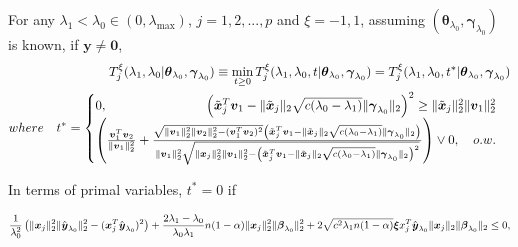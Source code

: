 \begin{theorem}
    \label{thm:2.2}
    For any $\lambda_1<\lambda_{0}\in (0,\lambda_\textrm{max})$, $j=1,2,...,p$ and $\xi=-1,1$, assuming $(\boldsymbol\theta_{\lambda_0},\boldsymbol\gamma_{\lambda_0})$ is known, if $\boldsymbol y\neq \boldsymbol 0$,
    \begin{gather}
        \begin{aligned}
            T^\xi_j(\lambda_1,\lambda_0|\boldsymbol\theta_{\lambda_0},\boldsymbol\gamma_{\lambda_0})\equiv\underset{t\geq 0}{\mathrm{min}}\,T^\xi_j(\lambda_1,\lambda_0,t|\boldsymbol\theta_{\lambda_0},\boldsymbol\gamma_{\lambda_0})=T^\xi_j(\lambda_1,\lambda_0,t^*|\boldsymbol\theta_{\lambda_0},\boldsymbol\gamma_{\lambda_0})\\
            where\quad t^*=\begin{cases}
            0,\hfill \left(\tilde{\boldsymbol x}_j^T\boldsymbol v_1-\norm{\tilde{\boldsymbol x}_j}_2\sqrt{c(\lambda_0-\lambda_1)}\norm{\boldsymbol\gamma_{\lambda_0}}_2\right)^2\geq \norm{\tilde{\boldsymbol x}_j}^2_2\norm{\boldsymbol v_1}^2_2\\
            \left(\frac{\boldsymbol v_1^T\boldsymbol v_2}{\norm{\boldsymbol v_1}_2^2}+\frac{\sqrt{\norm{\boldsymbol v_1}_2^2\norm{\boldsymbol v_2}_2^2-(\boldsymbol v_1^T\boldsymbol v_2)^2}\left(\tilde{\boldsymbol x}_j^T\boldsymbol v_1-\norm{\tilde{\boldsymbol x}_j}_2\sqrt{c(\lambda_0-\lambda_1)}\norm{\boldsymbol\gamma_{\lambda_0}}_2\right)}{\norm{\boldsymbol v_1}_2^2\sqrt{\norm{\boldsymbol x_j}_2^2\norm{\boldsymbol v_1}_2^2-\left(\tilde{\boldsymbol x}_j^T\boldsymbol v_1-\norm{\tilde{\boldsymbol x}_j}_2\sqrt{c(\lambda_0-\lambda_1)}\norm{\boldsymbol\gamma_{\lambda_0}}_2\right)^2}}\right)\vee 0,\hfill\quad o.w.
            \end{cases}
        \end{aligned}
    \end{gather}
\end{theorem}

In terms of primal variables, $t^*=0$ if

\begin{equation}
    \frac{1}{\lambda_0^2}\left(\lVert\boldsymbol x_j\rVert_2^2\lVert\hat{\boldsymbol y}_{\lambda_0}\rVert_2^2-(\boldsymbol x_j^T\hat{\boldsymbol y}_{\lambda_0})^2\right)+\frac{2\lambda_1-\lambda_0}{\lambda_0\lambda_1}n(1-\alpha)\lVert\boldsymbol x_j\rVert_2^2\lVert\boldsymbol\beta_{\lambda_0}\rVert_2^2+2\sqrt{c^2\lambda_1n(1-\alpha)}\boldsymbol \xi x_j^T\hat{\boldsymbol y}_{\lambda_0}\lVert\boldsymbol x_j\rVert_2\lVert\boldsymbol\beta_{\lambda_0}\rVert_2\leq 0,
\end{equation}

